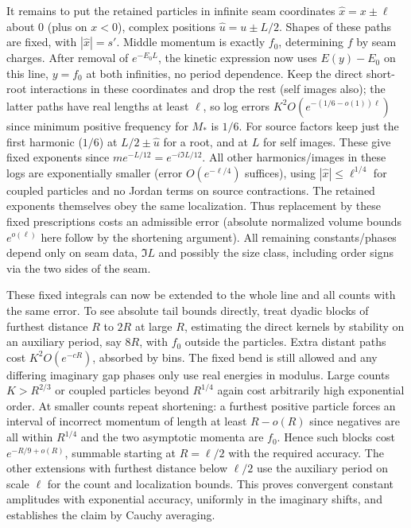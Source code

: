 It remains to put the retained particles in infinite seam coordinates \(\hat x=x\pm\ell\) about 0 (plus on \(x<0\)), complex positions \(\hat u=u\pm L/2\). Shapes of these paths are fixed, with \(|\hat x|=s'\). Middle momentum is exactly \(f_0\), determining \(f\) by seam charges. After removal of \(e^{-E_0 L}\), the kinetic expression now uses \(E(y)-E_0\) on this line, \(y=f_0\) at both infinities, no period dependence. Keep the direct short-root interactions in these coordinates and drop the rest (self images also); the latter paths have real lengths at least \(\ell\), so log errors \(K^2 O(e^{-(1/6-o(1))\ell})\) since minimum positive frequency for \(M_*\) is \(1/6\). For source factors keep just the first harmonic (\(1/6\)) at \(L/2\pm\hat u\) for a root, and at \(L\) for self images. These give fixed exponents since \(m e^{-L/12}=e^{-i\Im L/12}\). All other harmonics/images in these logs are exponentially smaller (error \(O(e^{-\ell/4})\) suffices), using \(|\hat x|\le\ell^{1/4}\) for coupled particles and no Jordan terms on source contractions. The retained exponents themselves obey the same localization. Thus replacement by these fixed prescriptions costs an admissible error (absolute normalized volume bounds \(e^{o(\ell)}\) here follow by the shortening argument). All remaining constants/phases depend only on seam data, \(\Im L\) and possibly the size class, including order signs via the two sides of the seam.

These fixed integrals can now be extended to the whole line and all counts with the same error. To see absolute tail bounds directly, treat dyadic blocks of furthest distance \(R\) to \(2R\) at large \(R\), estimating the direct kernels by stability on an auxiliary period, say \(8R\), with \(f_0\) outside the particles. Extra distant paths cost \(K^2 O(e^{-cR})\), absorbed by bins. The fixed bend is still allowed and any differing imaginary gap phases only use real energies in modulus. Large counts \(K>R^{2/3}\) or coupled particles beyond \(R^{1/4}\) again cost arbitrarily high exponential order. At smaller counts repeat shortening: a furthest positive particle forces an interval of incorrect momentum of length at least \(R-o(R)\) since negatives are all within \(R^{1/4}\) and the two asymptotic momenta are \(f_0\). Hence such blocks cost \(e^{-R/9+o(R)}\), summable starting at \(R=\ell/2\) with the required accuracy. The other extensions with furthest distance below \(\ell/2\) use the auxiliary period on scale \(\ell\) for the count and localization bounds. This proves convergent constant amplitudes with exponential accuracy, uniformly in the imaginary shifts, and establishes the claim by Cauchy averaging.


